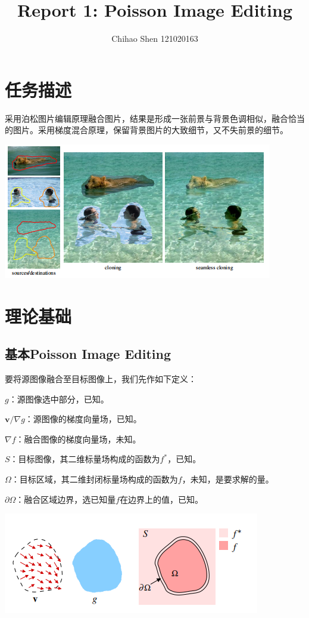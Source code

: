 \documentclass[12pt, a4paper, oneside]{report}
\title{Report 1: Poisson Image Editing}
\author{Chihao Shen 121020163}
\begin{document}
	
	\rmfamily
	\maketitle
	
	\songti 
	
	\section{任务描述}
	采用泊松图片编辑原理融合图片，结果是形成一张前景与背景色调相似，融合恰当的图片。采用梯度混合原理，保留背景图片的大致细节，又不失前景的细节。
	
	\centerline{	
		\includegraphics[scale=0.6]{task.png}
	}
	\section{理论基础}
	\subsection{基本Poisson Image Editing}
	要将源图像融合至目标图像上，我们先作如下定义：
	
	\noindent $g$：源图像选中部分，已知。
	
	\noindent $\textbf{v}/\nabla g$：源图像的梯度向量场，已知。
	
	\noindent $\nabla f$：融合图像的梯度向量场，未知。
	
	\noindent $S$：目标图像，其二维标量场构成的函数为$f^*$，已知。
	
	\noindent $\Omega$：目标区域，其二维封闭标量场构成的函数为$f$，未知，是要求解的量。
	
	\noindent $\partial\Omega$：融合区域边界，选已知量$f$在边界上的值，已知。
	
	\centerline{	
		\includegraphics[scale=0.8]{task2.png}
	}
	
\end{document}
